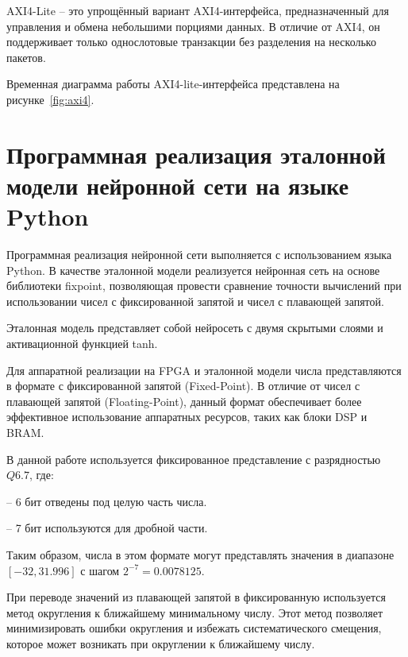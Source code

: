 
  AXI4-Lite – это упрощённый вариант AXI4-интерфейса, предназначенный для 
управления и обмена небольшими порциями данных. В отличие от AXI4, он 
поддерживает только однослотовые транзакции без разделения на несколько 
пакетов\cite{vivado_axi}.

  Временная диаграмма работы AXI4-lite-интерфейса представлена на 
рисунке~\ref{fig:axi4}.
    

\section{Программная реализация эталонной модели нейронной сети на языке Python}
\hspace*{12.5 mm}Программная реализация нейронной сети выполняется с 
использованием языка Python.  
В качестве эталонной модели реализуется нейронная сеть на основе библиотеки 
{fixpoint}, позволяющая провести сравнение точности вычислений при 
использовании чисел с фиксированной запятой и чисел с плавающей запятой.

Эталонная модель представляет собой нейросеть с двумя скрытыми слоями и 
активационной функцией {tanh}.  

Для аппаратной реализации на FPGA и эталонной модели числа представляются в 
формате с фиксированной запятой (Fixed-Point). В отличие от чисел с плавающей 
запятой (Floating-Point), данный формат обеспечивает более эффективное 
использование аппаратных ресурсов, таких как блоки DSP и BRAM.\@

В данной работе используется фиксированное представление с разрядностью $Q6.7$,
где:

  – 6 бит отведены под целую часть числа.

  – 7 бит используются для дробной части.

Таким образом, числа в этом формате могут представлять значения в диапазоне 
$[-32, 31.996]$ с шагом $2^{-7} = 0.0078125$.

При переводе значений из плавающей запятой в фиксированную используется метод 
округления к ближайшему минимальному числу. 
Этот метод позволяет минимизировать ошибки округления и избежать 
систематического смещения, которое может возникать при округлении к ближайшему 
числу.


